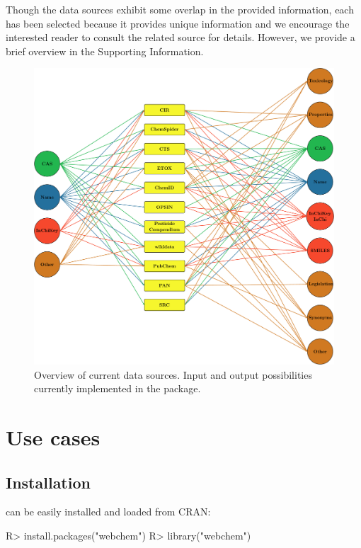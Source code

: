\documentclass[article, shortnames]{jss}\usepackage[]{graphicx}\usepackage[]{color}
\begin{document}
Though the data sources exhibit some overlap in the provided information, each has been selected because it provides unique information and we encourage the interested reader to consult the related source for details. 
However, we provide a brief overview in the Supporting Information.

\begin{figure}[ht]
  \centering
  \includegraphics{fig1}
  \caption{Overview of current data sources. Input and output possibilities currently implemented in the package.}
  \label{fig:fig1}
\end{figure}


\section[Use cases]{Use cases}
\subsection[Install webchem]{Installation}
 can be easily installed and loaded from CRAN:

\begin{CodeChunk}
\begin{CodeInput}
R> install.packages("webchem")
R> library("webchem")
\end{CodeInput}
\end{CodeChunk}
\end{document}

